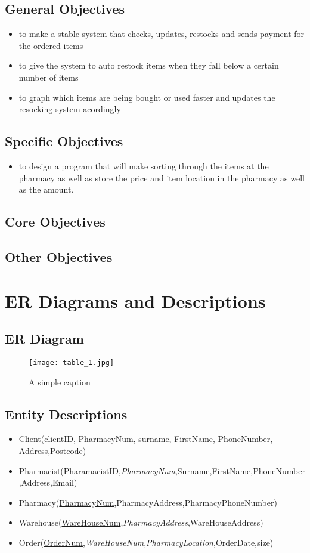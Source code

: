 \subsection{General Objectives}
\begin{itemize}
	\item to make a stable system that checks, updates, restocks and sends payment for the ordered items
	\item to give the system to auto restock items when they fall below a certain number of items
	\item to graph which items are being bought or used faster and updates the resocking system acordingly 
\end{itemize}
\subsection{Specific Objectives}
\begin{itemize}
	\item to design a program that will make sorting through the items at the pharmacy as well as store the price and item location in the pharmacy as well as the amount.
\end{itemize}
\subsection{Core Objectives}

\subsection{Other Objectives}

\section{ER Diagrams and Descriptions}

\subsection{ER Diagram}
\begin{figure}[ht!]
\centering
\texttt{[image: table\_1.jpg]}
\caption{A simple caption \label{overflow}}
\end{figure}
\subsection{Entity Descriptions}
\begin{itemize}
\item Client(\underline{clientID}, PharmacyNum, surname, FirstName, PhoneNumber, Address,Postcode)
\item Pharmacist(\underline{PharamacistID},\emph{PharmacyNum},Surname,FirstName,PhoneNumber,Address,Email)
\item Pharmacy(\underline{PharmacyNum},PharmacyAddress,PharmacyPhoneNumber)
\item Warehouse(\underline{WareHouseNum},\emph{PharmacyAddress},WareHouseAddress)
\item Order(\underline{OrderNum},\emph{WareHouseNum},\emph{PharmacyLocation},OrderDate,size)
\end{itemize}

